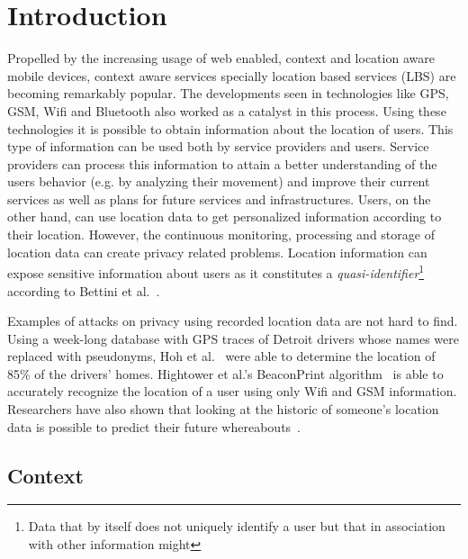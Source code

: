 \chapter{Introduction}
\label{cha:introduction}

Propelled by the increasing usage of web enabled, context and location
aware mobile devices, context aware services specially location based
services (LBS) are becoming remarkably popular. The developments seen
in technologies like GPS, GSM, Wifi and Bluetooth also worked as a
catalyst in this process. Using these technologies it is possible to
obtain information about the location of users. This type of
information can be used both by service providers and users. Service
providers can process this information to attain a better
understanding of the users behavior (e.g. by analyzing their movement)
and improve their current services as well as plans for future
services and infrastructures. Users, on the other hand, can use
location data to get personalized information according to their
location. However, the continuous monitoring, processing and storage
of location data can create privacy related problems. Location
information can expose sensitive information about users as it
constitutes a \emph{quasi-identifier}\footnote{Data that by itself
  does not uniquely identify a user but that in association with other
  information might} according to Bettini et
al.~\cite{bettini2005protecting}. 

Examples of attacks on privacy using
recorded location data are not hard to find. Using a week-long
database with GPS traces of Detroit drivers whose names were replaced
with pseudonyms, Hoh et al.~\cite{hoh2006enhancing} were able to
determine the location of 85\% of the drivers' homes. Hightower et
al.'s BeaconPrint algorithm~\cite{hightower2005learning} is able to
accurately recognize the location of a user using only Wifi and GSM
information. Researchers have also shown that looking at the historic
of someone's location data is possible to predict their future
whereabouts~\cite{krumm2006predestination,froehlich2008route}.


\section{Context}
\label{sec:context}

